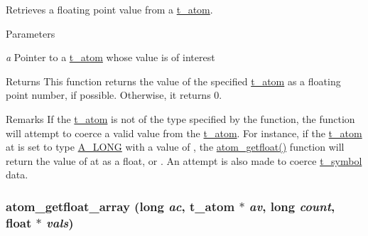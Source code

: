 Retrieves a floating point value from a \hyperlink{structt__atom}{t\_\-atom}. 
\begin{DoxyParams}{Parameters}
\item[{\em a}]Pointer to a \hyperlink{structt__atom}{t\_\-atom} whose value is of interest \end{DoxyParams}
\begin{DoxyReturn}{Returns}
This function returns the value of the specified \hyperlink{structt__atom}{t\_\-atom} as a floating point number, if possible. Otherwise, it returns 0.
\end{DoxyReturn}
\begin{DoxyRemark}{Remarks}
If the \hyperlink{structt__atom}{t\_\-atom} is not of the type specified by the function, the function will attempt to coerce a valid value from the \hyperlink{structt__atom}{t\_\-atom}. For instance, if the \hyperlink{structt__atom}{t\_\-atom} {\ttfamily at} is set to type \hyperlink{group__atom_gga8aa6700e9f00b132eb376db6e39ade47a002f28879581a6f66ea492b994b96f1e}{A\_\-LONG} with a value of {}, the \hyperlink{group__atom_ga28f52239a67244db2e821320702712ca}{atom\_\-getfloat()} function will return the value of {\ttfamily at} as a float, or {}. An attempt is also made to coerce \hyperlink{structt__symbol}{t\_\-symbol} data. 
\end{DoxyRemark}
\hypertarget{group__atom_ga0d3bc27f1de1bacbd8026c81a7b7e3d3}{
\subsubsection[{atom\_\-getfloat\_\-array}]{ atom\_\-getfloat\_\-array (long {\em ac}, \/  {\bf t\_\-atom} $\ast$ {\em av}, \/  long {\em count}, \/  float $\ast$ {\em vals})}}
\label{group__atom_ga0d3bc27f1de1bacbd8026c81a7b7e3d3}


